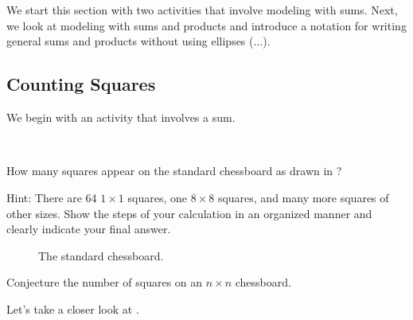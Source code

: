 \section{\secsumprod}
\label{sec_model_sum_prod}

We start this section with two activities that involve modeling with sums.  Next, we look at modeling with sums and products and introduce a notation for writing general sums and products without using ellipses ($\ldots$).  



\newcommand{\subhowmanysq}{Counting Squares}
\subsection{\subhowmanysq}
\label{sub_how_many_squares}

We begin with an activity that involves a sum.

\begin{act} 
\label{act_how_many_sq_puzzle}
~
    \begin{actpart}
        \item How many squares appear on the standard chessboard as drawn in ?  
        
        Hint:  There are 64 $1 \times 1$ squares, one $8 \times 8$ squares, and many more squares of other sizes.  Show the steps of your calculation in an organized manner and clearly indicate your final answer.

        \begin{figure}[hbtp]
            \centering
            \scalebox{.5}{}
            \caption{The standard chessboard.}
            \label{fig_chessboard_hms}
        \end{figure}

        \item Conjecture the number of squares on an $n \times n $ chessboard.  
    \end{actpart}
\end{act}

Let's take a closer look at .

